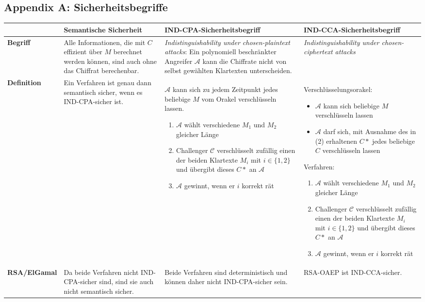 \begin{landscape}
\setlength\extrarowheight{5pt}

\section{Appendix A: Sicherheitsbegriffe}
\begin{table}[H]
\begin{tabularx}{\linewidth}{|l|X|X|X|}
\hline
& \textbf{Semantische Sicherheit} 	& \textbf{IND-CPA-Sicherheitsbegriff} 	& \textbf{IND-CCA-Sicherheitsbegriff} 	\\
\hline
\textbf{Begriff} &
Alle Informationen, die mit \(C\) effizient über \(M\) berechnet werden können, sind auch ohne das Chiffrat berechenbar. &
\textit{Indistinguishability under chosen-plaintext attacks}: Ein polynomiell beschränkter Angreifer \(\mathcal{A}\) kann die Chiffrate nicht von selbst gewählten Klartexten unterscheiden. &
\textit{Indistinguishability under chosen-ciphertext attacks}\\
\hline
\textbf{Definition} &
Ein Verfahren ist genau dann semantisch sicher, wenn es IND-CPA-sicher ist.&
\(\mathcal{A}\) kann sich zu jedem Zeitpunkt jedes beliebige \(M\) vom Orakel verschlüsseln lassen.
\begin{enumerate}
	\item \(\mathcal{A}\) wählt verschiedene \(M_1\) und \(M_2\) gleicher Länge
	\item Challenger \(\mathcal{C}\) verschlüsselt zufällig einen der beiden Klartexte \(M_i\) mit \(i \in \{1,2\}\) und übergibt dieses \(C*\) an \(\mathcal{A}\)
	\item \(\mathcal{A}\) gewinnt, wenn er \(i\) korrekt rät
\end{enumerate}&
Verschlüsselungsorakel:
\begin{itemize}
	\item \(\mathcal{A}\) kann sich beliebige \(M\) verschlüsseln lassen
	\item \(\mathcal{A}\) darf sich, mit Ausnahme des in (2) erhaltenen \(C*\) jedes beliebige \(C\) verschlüsseln lassen
\end{itemize}
Verfahren:
\begin{enumerate}
	\item \(\mathcal{A}\) wählt verschiedene \(M_1\) und \(M_2\) gleicher Länge
	\item Challenger \(\mathcal{C}\) verschlüsselt zufällig einen der beiden Klartexte \(M_i\) mit \(i \in \{1,2\}\) und übergibt dieses \(C*\) an \(\mathcal{A}\)
	\item \(\mathcal{A}\) gewinnt, wenn er \(i\) korrekt rät
\end{enumerate}\\
\hline
\textbf{RSA/ElGamal}&
Da beide Verfahren nicht IND-CPA-sicher sind, sind sie auch nicht semantisch sicher.&
Beide Verfahren sind deterministisch und können daher nicht IND-CPA-sicher sein.&
RSA-OAEP ist IND-CCA-sicher.\\
\hline
\end{tabularx}
\end{table}

\end{landscape}

